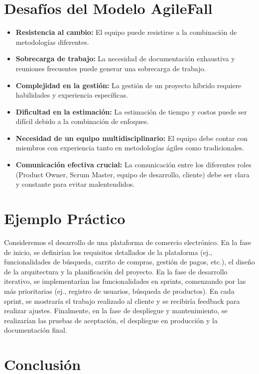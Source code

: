 \documentclass[12pt, spanish]{article}
\begin{document}
\section*{Desafíos del Modelo AgileFall}

\begin{itemize}
    \item \textbf{Resistencia al cambio:}  El equipo puede resistirse a la combinación de metodologías diferentes.
    \item \textbf{Sobrecarga de trabajo:} La necesidad de documentación exhaustiva y reuniones frecuentes puede generar una sobrecarga de trabajo.
    \item \textbf{Complejidad en la gestión:} La gestión de un proyecto híbrido requiere habilidades y experiencia específicas.
    \item \textbf{Dificultad en la estimación:} La estimación de tiempo y costos puede ser difícil debido a la combinación de enfoques.
    \item \textbf{Necesidad de un equipo multidisciplinario:} El equipo debe contar con miembros con experiencia tanto en metodologías ágiles como tradicionales.
    \item \textbf{Comunicación efectiva crucial:} La comunicación entre los diferentes roles (Product Owner, Scrum Master, equipo de desarrollo, cliente) debe ser clara y constante para evitar malentendidos.
\end{itemize}

\section*{Ejemplo Práctico}

Consideremos el desarrollo de una plataforma de comercio electrónico. En la fase de inicio, se definirían los requisitos detallados de la plataforma (ej., funcionalidades de búsqueda, carrito de compras, gestión de pagos, etc.), el diseño de la arquitectura y la planificación del proyecto.  En la fase de desarrollo iterativo, se implementarían las funcionalidades en sprints, comenzando por las más prioritarias (ej., registro de usuarios, búsqueda de productos).  En cada sprint, se mostraría el trabajo realizado al cliente y se recibiría feedback para realizar ajustes.  Finalmente, en la fase de despliegue y mantenimiento, se realizarían las pruebas de aceptación, el despliegue en producción y la documentación final.

\section*{Conclusión}
\end{document}

